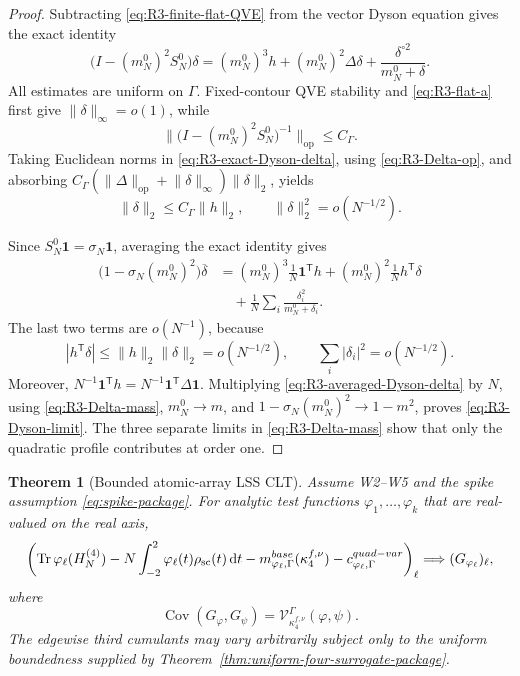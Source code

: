 \documentclass[10pt,a4paper]{amsart}
\newtheorem{theorem}{Theorem}[section]
\newcommand{\Cov}{\operatorname{Cov}}
\newcommand{\Tr}{\operatorname{Tr}}
\newcommand{\scal}{\mathrm{sc}}
\newcommand{\dd}{\mathrm d}
\newcommand{\op}{\mathrm{op}}
\newcommand{\one}{\mathbf 1}
\newcommand{\norm}[1]{\lVert #1\rVert}
\begin{document}
\begin{proof}
Subtracting \eqref{eq:R3-finite-flat-QVE} from the vector Dyson equation
gives the exact identity
\begin{equation}\label{eq:R3-exact-Dyson-delta}
 \bigl(I-(m_N^0)^2S_N^0\bigr)\delta
 =(m_N^0)^3h+(m_N^0)^2\Delta\delta
 +\frac{\delta^{\circ2}}{m_N^0+\delta}.
\end{equation}
All estimates are uniform on \(\Gamma\).  Fixed-contour QVE stability and
\eqref{eq:R3-flat-a} first give \(\norm\delta_\infty=o(1)\), while
\[
 \norm{\bigl(I-(m_N^0)^2S_N^0\bigr)^{-1}}_{\op}
 \le C_\Gamma.
\]
Taking Euclidean norms in \eqref{eq:R3-exact-Dyson-delta}, using
\eqref{eq:R3-Delta-op}, and absorbing
\(C_\Gamma(\norm\Delta_{\op}+\norm\delta_\infty)\norm\delta_2\), yields
\begin{equation}\label{eq:R3-delta-two}
 \norm\delta_2\le C_\Gamma\norm h_2,
 \qquad \norm\delta_2^2=o(N^{-1/2}).
\end{equation}

Since \(S_N^0\one=\sigma_N\one\), averaging the exact identity gives
\begin{align}
 \bigl(1-\sigma_N(m_N^0)^2\bigr)\overline\delta
 &=(m_N^0)^3\frac1N\one^{\mathsf T}h
 +(m_N^0)^2\frac1N h^{\mathsf T}\delta\nonumber\\
 &\quad+\frac1N\sum_i\frac{\delta_i^2}{m_N^0+\delta_i}.
 \label{eq:R3-averaged-Dyson-delta}
\end{align}
The last two terms are \(o(N^{-1})\), because
\[
 |h^{\mathsf T}\delta|
 \le\norm h_2\norm\delta_2=o(N^{-1/2}),
 \qquad
 \sum_i|\delta_i|^2=o(N^{-1/2}).
\]
Moreover, \(N^{-1}\one^{\mathsf T}h=N^{-1}\one^{\mathsf T}\Delta\one\).
Multiplying \eqref{eq:R3-averaged-Dyson-delta} by \(N\), using
\eqref{eq:R3-Delta-mass}, \(m_N^0\to m\), and
\(1-\sigma_N(m_N^0)^2\to1-m^2\), proves
\eqref{eq:R3-Dyson-limit}.  The three separate limits in
\eqref{eq:R3-Delta-mass} show that only the quadratic profile contributes at
order one.
\end{proof}

\begin{theorem}[Bounded atomic-array LSS CLT]
\label{thm:R3-bounded-CLT}
Assume W2--W5 and the spike assumption
\eqref{eq:spike-package}.  For analytic test functions
\(\varphi_1,\ldots,\varphi_k\) that are real-valued on the real axis,
\begin{equation}\label{eq:R3-final-CLT}
 \left(
 \Tr\varphi_\ell(H_N^{(4)})
 -N\int_{-2}^2\varphi_\ell(t)\rho_{\scal}(t)\,\dd t
 -m_{\varphi_\ell,\Gamma}^{\rm base}(\kappa_4^{f,\nu})
 -c_{\varphi_\ell,\Gamma}^{\rm quad-var}
 \right)_\ell
 \Longrightarrow (G_{\varphi_\ell})_\ell ,
\end{equation}
where
\[
 \Cov(G_\varphi,G_\psi)
 =\mathcal V_{\kappa_4^{f,\nu}}^\Gamma(\varphi,\psi).
\]
The edgewise third cumulants may vary arbitrarily subject only to the uniform boundedness supplied by
Theorem~\ref{thm:uniform-four-surrogate-package}.
\end{theorem}
\end{document}
